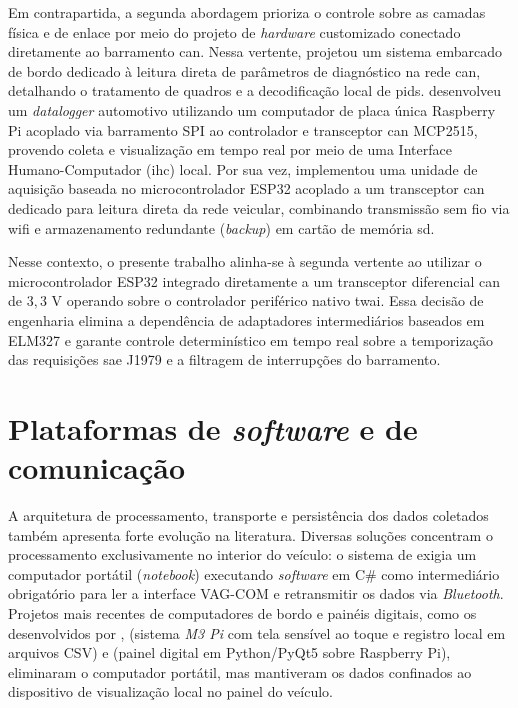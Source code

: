 \documentclass[
	12pt,				%
	openright,			%
	twoside,			%
	a4paper,			%
	english,			%
	brazil				%
	]{abntex2}
\newcounter{quadro}
\begin{document}
Em contrapartida, a segunda abordagem prioriza o controle sobre as camadas física e de
enlace por meio do projeto de \textit{hardware} customizado conectado diretamente ao
barramento \acrshort{can}. Nessa vertente,  projetou um
sistema embarcado de bordo dedicado à leitura direta de parâmetros de diagnóstico na
rede \acrshort{can}, detalhando o tratamento de quadros e a decodificação local de
\acrshort{pid}s.  desenvolveu um \textit{datalogger} automotivo
utilizando um computador de placa única Raspberry Pi acoplado via barramento SPI ao
controlador e transceptor \acrshort{can} MCP2515, provendo coleta e visualização em
tempo real por meio de uma Interface Humano-Computador (\acrshort{ihc}) local. Por sua
vez,  implementou uma unidade de aquisição baseada no
microcontrolador ESP32 acoplado a um transceptor \acrshort{can} dedicado para leitura
direta da rede veicular, combinando transmissão sem fio via \acrshort{wifi} e
armazenamento redundante (\textit{backup}) em cartão de memória \acrshort{sd}.

Nesse contexto, o presente trabalho alinha-se à segunda vertente ao utilizar o
microcontrolador ESP32 integrado diretamente a um transceptor diferencial \acrshort{can}
de $3{,}3\text{ V}$ operando sobre o controlador periférico nativo \acrshort{twai}. Essa
decisão de engenharia elimina a dependência de adaptadores intermediários baseados em
ELM327 \cite{elmelectronics_elm327} e garante controle determinístico em tempo real
sobre a temporização das requisições \acrshort{sae} J1979 e a filtragem de interrupções
do barramento.

\section{Plataformas de \textit{software} e de comunicação}

A arquitetura de processamento, transporte e persistência dos dados coletados também
apresenta forte evolução na literatura. Diversas soluções concentram o processamento
exclusivamente no interior do veículo: o sistema de  exigia um
computador portátil (\textit{notebook}) executando \textit{software} em C\# como
intermediário obrigatório para ler a interface VAG-COM e retransmitir os dados via
\textit{Bluetooth}. Projetos mais recentes de computadores de bordo e painéis digitais,
como os desenvolvidos por ,  (sistema
\textit{M3 Pi} com tela sensível ao toque e registro local em arquivos CSV) e
 (painel digital em Python/PyQt5 sobre Raspberry Pi), eliminaram
o computador portátil, mas mantiveram os dados confinados ao dispositivo de visualização
local no painel do veículo.
\end{document}
